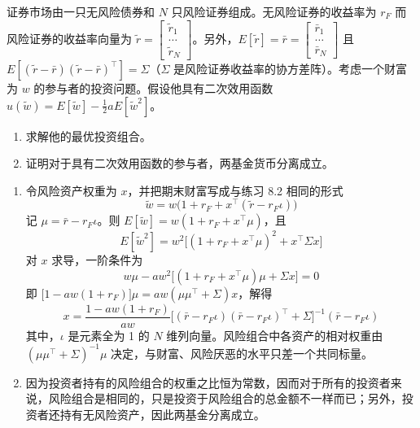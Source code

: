 \begin{problem}
 证券市场由一只无风险债券和 $N$ 只风险证券组成。无风险证券的收益率为 $r_{F}$ 而风险证券的收益率向量为 $\tilde{r}=\begin{bmatrix}\tilde{r}_{1} \\ \ldots \\ \tilde{r}_{N}\end{bmatrix}$。另外，$E[\tilde{r}]=\bar{r}=\begin{bmatrix}\bar{r}_{1} \\ \ldots \\ \bar{r}_{N}\end{bmatrix}$ 且 $E[(\tilde{r}-\bar{r})(\tilde{r}-\bar{r})^{\top}]=\Sigma$（$\Sigma$ 是风险证券收益率的协方差阵）。考虑一个财富为 $w$ 的参与者的投资问题。假设他具有二次效用函数 $u(\tilde{w})=E[\tilde{w}]-\tfrac12 a E[\tilde{w}^{2}]$。
\begin{enumerate}[label=(\alph*)]
    \item 求解他的最优投资组合。
    \item 证明对于具有二次效用函数的参与者，两基金货币分离成立。
\end{enumerate}
\end{problem}
\begin{solution}
\begin{enumerate}[label=(\alph*)]
    \item 令风险资产权重为 $x$，并把期末财富写成与练习 8.2 相同的形式
    \[
        \tilde{w}=w\bigl(1+r_{F}+x^{\top}(\tilde{r}-r_{F}\iota)\bigr)
    \]
    记 $\mu=\bar{r}-r_{F}\iota$。则 $E[\tilde{w}]=w(1+r_{F}+x^{\top}\mu)$，且
    \[
        E[\tilde{w}^{2}]=w^{2}\bigl[(1+r_{F}+x^{\top}\mu)^{2}+x^{\top}\Sigma x\bigr]
    \]
    对 $x$ 求导，一阶条件为
    \[
        w\mu-aw^{2}\bigl[(1+r_{F}+x^{\top}\mu)\mu+\Sigma x\bigr]=0
    \]
    即 $\bigl[1-aw(1+r_{F})\bigr]\mu=aw(\mu\mu^{\top}+\Sigma)x$，解得
    \[
        x=\frac{1-aw(1+r_{F})}{aw}\bigl[(\bar{r}-r_{F}\iota)(\bar{r}-r_{F}\iota)^{\top}+\Sigma\bigr]^{-1}(\bar{r}-r_{F}\iota)
    \]
    其中，$\iota$ 是元素全为 1 的 $N$ 维列向量。风险组合中各资产的相对权重由 $(\mu\mu^{\top}+\Sigma)^{-1}\mu$ 决定，与财富、风险厌恶的水平只差一个共同标量。

    \item 因为投资者持有的风险组合的权重之比恒为常数，因而对于所有的投资者来说，风险组合是相同的，只是投资于风险组合的总金额不一样而已；另外，投资者还持有无风险资产，因此两基金分离成立。
\end{enumerate}
\end{solution}

